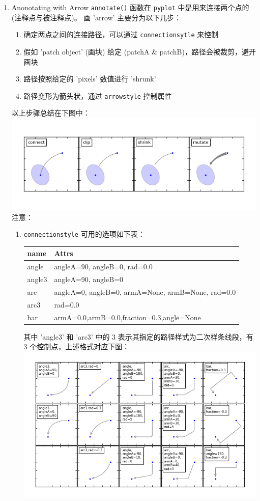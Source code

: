 \documentclass[11pt]{ctexart}
\begin{document}
\begin{enumerate}
\begin{enumerate}
\item Anonotating with Arrow
\label{sec:orgheadline25}
\texttt{annotate()} 函数在 \texttt{pyplot} 中是用来连接两个点的 (注释点与被注释点)。
画 'arrow' 主要分为以下几步：
\begin{enumerate}
\item 确定两点之间的连接路径，可以通过 \texttt{connectionsytle} 来控制
\item 假如 'patch object' (画块) 给定 (patchA \& patchB)，路径会被裁剪，避开画块
\item 路径按照给定的 'pixels' 数值进行 'shrunk'
\item 路径变形为箭头状，通过 \texttt{arrowstyle} 控制属性
\end{enumerate}
以上步骤总结在下图中：
\includegraphics[width=.9\linewidth]{figs/annotation_03.png}
注意： 
\begin{enumerate}
\item \texttt{connectionstyle} 可用的选项如下表：
\begin{center}
\begin{tabular}{ll}
name & Attrs\\
\hline
angle & angleA=90, angleB=0, rad=0.0\\
angle3 & angleA=90, angleB=0\\
arc & angleA=0, angleB=0, armA=None, armB=None, rad=0.0\\
arc3 & rad=0.0\\
bar & armA=0.0,armB=0.0,fraction=0.3,angle=None\\
\end{tabular}
\end{center}
其中 'angle3' 和 'arc3' 中的 3 表示其指定的路径样式为二次样条线段，有 3 个控制点，上述格式对应下图：
\includegraphics[width=.9\linewidth]{figs/annotation_04.png}

\end{enumerate}
\end{enumerate}
\end{enumerate}
\end{document}
